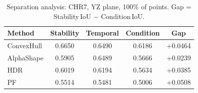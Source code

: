 \begin{table}[ht]
\centering
\small
\caption{Separation analysis: CHR7, YZ plane, 100\% of points. Gap = Stability\,IoU $-$ Condition\,IoU.}
\label{tab:sep_chr7}
\begin{tabular}{lcccc}
\toprule
Method & Stability & Temporal & Condition & Gap \\
\midrule
ConvexHull & 0.6650 & 0.6490 & 0.6186 & +0.0464 \\
AlphaShape & 0.5905 & 0.6489 & 0.5666 & +0.0239 \\
HDR & 0.6019 & 0.6194 & 0.5634 & +0.0385 \\
PF & 0.5514 & 0.5481 & 0.5006 & +0.0508 \\
\bottomrule
\end{tabular}
\end{table}